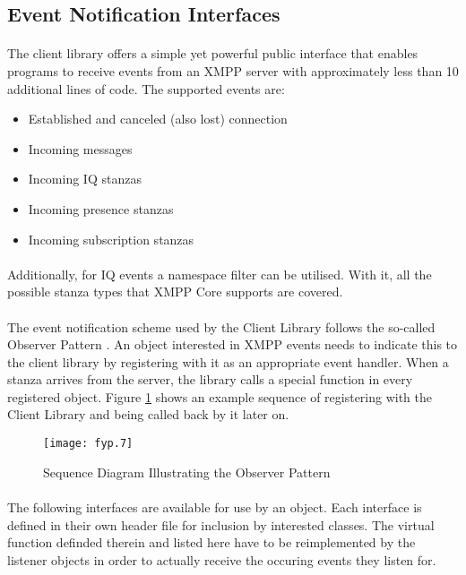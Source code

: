 \subsection{Event Notification Interfaces}
\label{sec:interfaces}
\paragraph{}
The client library offers a simple yet powerful public interface that enables programs to receive events from an XMPP server with approximately less than 10 additional lines of code. The supported events are:
\begin{itemize}
\item Established and canceled (also lost) connection
\item Incoming messages
\item Incoming IQ stanzas
\item Incoming presence stanzas
\item Incoming subscription stanzas
\end{itemize}
\paragraph{}
Additionally, for IQ events a namespace filter can be utilised. With it, all the possible stanza types that XMPP Core supports are covered.

\paragraph{}
The event notification scheme used by the Client Library follows the so-called Observer Pattern \cite{wikipedia003}. An object interested in XMPP events needs to indicate this to the client library by registering with it as an appropriate event handler. When a stanza arrives from the server, the library calls a special function in every registered object. Figure \ref{fig:observer1} shows an example sequence of registering with the Client Library and being called back by it later on.

\begin{figure}[H]
\begin{center}
\texttt{[image: fyp.7]}
\end{center}
\caption{Sequence Diagram Illustrating the Observer Pattern}
\label{fig:observer1}
\end{figure}
\paragraph{}
The following interfaces are available for use by an object. Each interface is defined in their own header file for inclusion by interested classes. The virtual function definded therein and listed here have to be reimplemented by the listener objects in order to actually receive the occuring events they listen for.

